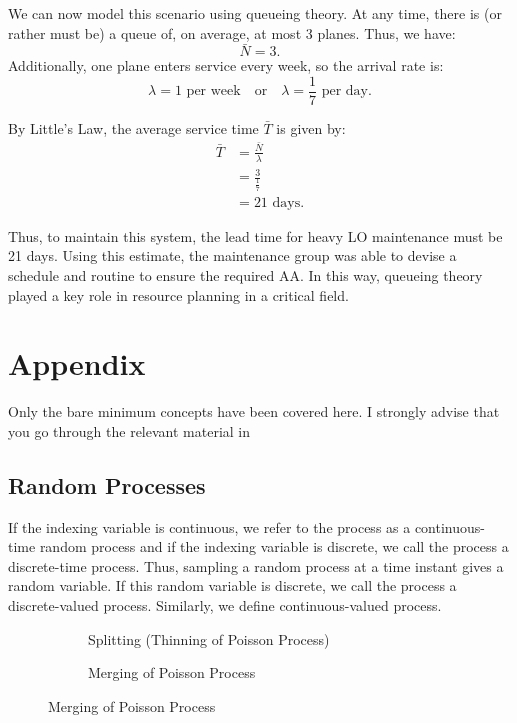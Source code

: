 \documentclass[11pt, a4paper]{report}
\begin{document}
We can now model this scenario using queueing theory. At any time, there is (or rather must be) a queue of, on average, at most 3 planes. Thus, we have:
\[
\bar{N} = 3.
\]
Additionally, one plane enters service every week, so the arrival rate is:
\[
\lambda = 1 \text{ per week} \quad \text{or} \quad \lambda = \frac{1}{7} \text{ per day}.
\]

By Little's Law, the average service time \(\bar{T}\) is given by:
\begin{align}
    \bar{T} &= \frac{\bar{N}}{\lambda} \\
    &= \frac{3}{\frac{1}{7}} \\
    &= 21 \text{ days}.
\end{align}

Thus, to maintain this system, the lead time for heavy LO maintenance must be 21 days. Using this estimate, the maintenance group was able to devise a schedule and routine to ensure the required AA. In this way, queueing theory played a key role in resource planning in a critical field.

\chapter{Appendix}
Only the bare minimum concepts have been covered here. I strongly advise that you go through the relevant material in \cite{pishro2014introduction}

\section{Random Processes}
If the indexing variable is continuous, we refer to the process as a continuous-time random process and if the indexing variable is discrete, we call the process a discrete-time process. Thus, sampling a random process at a time instant gives a random variable. If this random variable is discrete, we call the process a discrete-valued process. Similarly, we define continuous-valued process. 

\begin{figure}
    \begin{subfigure}[b]{0.45\textwidth}
        \centering
        
        \caption{Splitting (Thinning of Poisson Process)}
        \label{fig:split}
    \end{subfigure}
    \hfill
    \begin{subfigure}[b]{0.45\textwidth}
        \centering
        
        \caption{Merging of Poisson Process}
        \label{fig:merging}
    \end{subfigure}
    \label{fig:splitMerge}
\end{figure}
\end{document}

